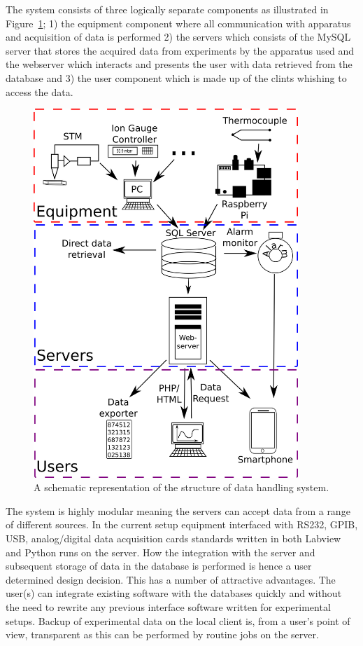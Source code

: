 The system consists of three logically separate components as illustrated in
Figure~\ref{fig:system_overview}; 1) the equipment component where all
communication with apparatus and acquisition of data is performed 2) the servers
which consists of the MySQL server that stores the acquired data from
experiments by the apparatus used and the webserver which interacts and
presents the user with data retrieved from the database and 3) the user
component which is made up of the clints whishing to access the data.
\begin{figure}
 \begin{center}
 \includegraphics[width=10cm]{system_overview.png}
 \caption{
   A schematic representation of the structure of data handling system.
   \label{fig:system_overview}
 } 
 \end{center}
\end{figure}

The system is highly modular meaning the servers can accept data from a range
of different sources. In the current setup equipment interfaced with RS232,
GPIB, USB, analog/digital data acquisition cards standards written in both
Labview and Python runs on the server. How the integration with the server and
subsequent storage of data in the database is performed is hence a user
determined design decision. This has a number of attractive advantages. The
user(s) can integrate existing software with the databases quickly and without
the need to rewrite any previous interface software written for experimental
setups. Backup of experimental data on the local client is, from a user's point
of view, transparent as this can be performed by routine jobs on the server.

